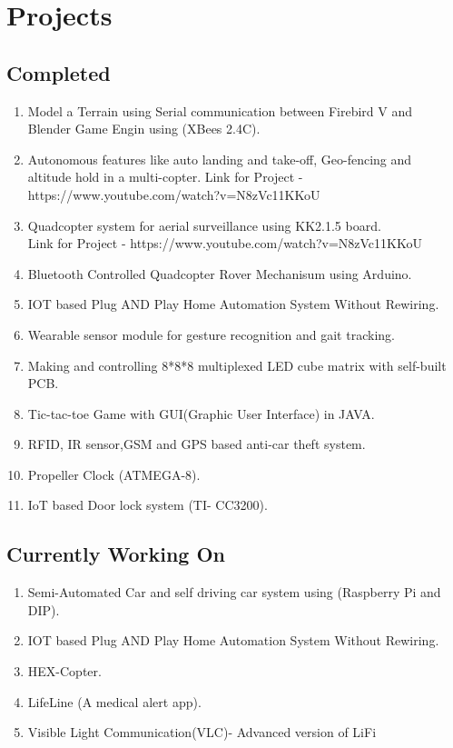 \documentclass[11pt]{article}
\begin{document}
\begin{minipage}{1.0\linewidth}

\section{\color{orange}Pro\color{black}jects}
\subsection{Co\color{purple}m\color{black}pl\color{purple}e\color{black}ted}
\begin{enumerate}
\item Model a Terrain using Serial communication between Firebird V and\\ Blender Game Engin using (XBees 2.4C).
\item Autonomous features like auto landing and take-off, Geo-fencing and\\ altitude hold in a multi-copter.
Link for Project - https://www.youtube.com/watch?v=N8zVc11KKoU
\item Quadcopter system for aerial surveillance using KK2.1.5 board. \\Link for Project - https://www.youtube.com/watch?v=N8zVc11KKoU
\item Bluetooth Controlled Quadcopter Rover Mechanisum using Arduino.
\item IOT based Plug AND Play Home Automation System Without Rewiring.
\item Wearable sensor module for gesture recognition and gait tracking. 
\item Making and controlling 8*8*8 multiplexed LED cube matrix with self-built PCB.
\item Tic-tac-toe Game with GUI(Graphic User Interface) in JAVA.
\item RFID, IR sensor,GSM and GPS based anti-car theft system.
\item Propeller Clock  (ATMEGA-8).
\item IoT based Door lock system (TI- CC3200).
\end{enumerate}
\subsection{Currently Working On}
\begin{enumerate}
\item Semi-Automated Car and self driving car system using (Raspberry Pi and\\ DIP). 
\item IOT based Plug AND Play Home Automation System Without Rewiring. 
\item HEX-Copter.
\item LifeLine (A medical alert app). 
\item Visible Light Communication(VLC)- Advanced version of LiFi
\end{enumerate}


\end{minipage}
\end{document}
